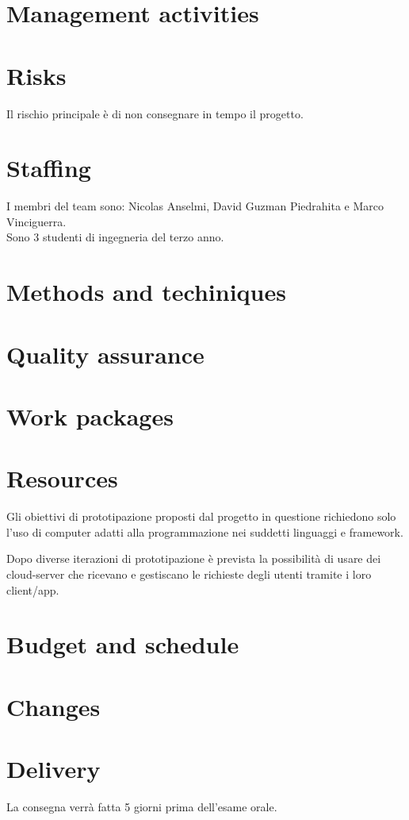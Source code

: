 \documentclass{article}
\begin{document}
\section{Management activities}

\section{Risks}
Il rischio principale è di non consegnare in tempo il progetto.
\section{Staffing}
I membri del team sono: Nicolas Anselmi, David Guzman Piedrahita e Marco Vinciguerra.
\\Sono 3 studenti di ingegneria del terzo anno.

\section{Methods and techiniques}

\section{Quality assurance}

\section{Work packages}


\section{Resources}
Gli obiettivi di prototipazione proposti dal progetto in questione richiedono solo l'uso di computer adatti alla programmazione nei suddetti linguaggi e framework.

Dopo diverse iterazioni di prototipazione è prevista la possibilità di usare dei cloud-server che ricevano e gestiscano le richieste degli utenti tramite i loro client/app. 

\section{Budget and schedule}

\section{Changes}

\section{Delivery}
La consegna verrà fatta 5 giorni prima dell'esame orale.
\end{document}
